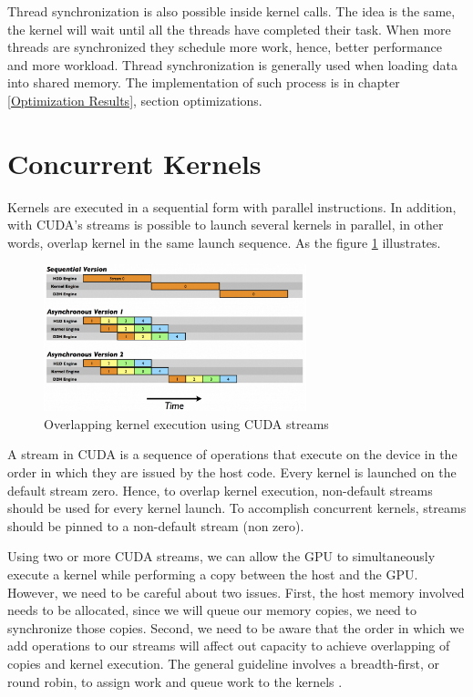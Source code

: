 Thread synchronization is also possible inside kernel calls. The idea is the same, the kernel will wait until all the threads have completed their task. When more threads are synchronized they schedule more work, hence, better performance and more workload. Thread synchronization is generally used when loading data into shared memory. The implementation of such process is in chapter \ref{Optimization Results}, section optimizations. 

\section{Concurrent Kernels}

Kernels are executed in a sequential form with parallel instructions. In addition, with CUDA's streams is possible to launch several kernels in parallel, in other words, overlap kernel in the same launch sequence. As the figure \ref{fig:streams} illustrates.

\begin{figure}[htbp]
	\centering
		\includegraphics[width=0.68\textwidth]{Figures/streams.png}
		\smallskip
	\caption[Concurrent Kernels]{Overlapping kernel execution using CUDA streams}
	\label{fig:streams}
\end{figure}

A stream in CUDA is a sequence of operations that execute on the device in the order in which they are issued by the host code. Every kernel is launched on the default stream zero. Hence, to overlap kernel execution, non-default streams should be used for every kernel launch. To accomplish concurrent kernels, streams should be pinned to a non-default stream (non zero)\cite{hwu}. 

Using two or more CUDA streams, we can allow the GPU to simultaneously execute a kernel while performing a copy between the host and the GPU. However, we need to be careful about two issues. First, the host memory involved needs to be allocated, since we will queue our memory copies, we need to synchronize those copies. Second, we need to be aware that the order in which we add operations to our streams will affect out capacity to achieve overlapping of copies and kernel execution. The general guideline involves a breadth-first, or round robin, to assign work and queue work to the kernels \cite{example}.


